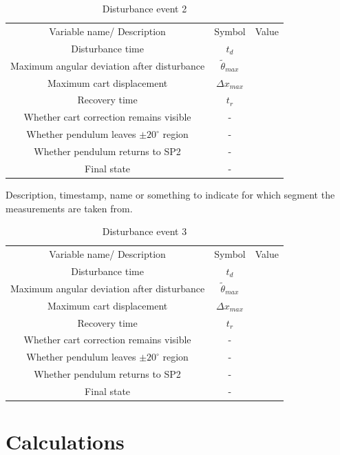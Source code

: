 \begin{table}
    \centering
    \begin{tabular}{ccc}
         Variable name/ Description&  Symbol & Value\\
         Disturbance time&  $t_d$& \\
         Maximum angular deviation after disturbance&  $\tilde\theta_{max}$& \\
         Maximum cart displacement&  $\Delta x_{max}$& \\
         Recovery time&  $t_r$& \\
         Whether cart correction remains visible&  -& \\
 Whether pendulum leaves $\pm 20^\circ$ region& -&\\
 Whether pendulum returns to SP2& -&\\
 Final state& -&\\
    \end{tabular}
    \caption{Disturbance event 2}
    \label{tab:placeholder}
\end{table}
Description, timestamp, name or something to indicate for which segment the measurements are taken from.
\begin{table}
    \centering
    \begin{tabular}{ccc}
         Variable name/ Description&  Symbol & Value\\
         Disturbance time&  $t_d$& \\
         Maximum angular deviation after disturbance&  $\tilde\theta_{max}$& \\
         Maximum cart displacement&  $\Delta x_{max}$& \\
         Recovery time&  $t_r$& \\
         Whether cart correction remains visible&  -& \\
 Whether pendulum leaves $\pm 20^\circ$ region& -&\\
 Whether pendulum returns to SP2& -&\\
 Final state& -&\\
    \end{tabular}
    \caption{Disturbance event 3}
    \label{tab:placeholder}
\end{table}
\section{Calculations}